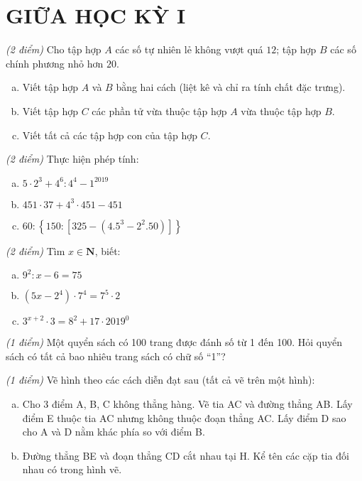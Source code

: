 
\section{GIỮA HỌC KỲ I}
\setcounter{ex}{0}
\begin{ex}  \textit{(2 điểm)} Cho tập hợp $A$ các số tự nhiên lẻ không vượt quá $12$; tập hợp $B$ các số chính phương nhỏ hơn $20$.
\begin{enumerate}[a)]
\item Viết tập hợp $A$ và $B$ bằng hai cách (liệt kê và chỉ ra tính chất đặc trưng).
\item Viết tập hợp $C$ các phần tử vừa thuộc tập hợp $A$ vừa thuộc tập hợp $B$. 
\item Viết tất cả các tập hợp con của tập hợp $C$.

\end{enumerate}
\end{ex}     \begin{ex} \textit{(2 điểm)} Thực hiện phép tính:
\begin{enumerate} [a)]
\item $5 \cdot 2^3+4^6:4^4-1^{2019}$
\item $451 \cdot 37 + {4^3} \cdot 451 - 451$
\item $60:\left\{ {150:\left[ {325 - \left( {{{4.5}^3} - {2^2}.50} \right)} \right]} \right\} $ 

\end{enumerate}
\end{ex}     \begin{ex}\textit{(2 điểm)} Tìm $x \in \mathbf{N}$, biết:
 \begin{enumerate}[a)]
\item ${9^2}:x - 6 = 75$
\item $\left( {5x - {2^4}} \right) \cdot{ 7^4} = {7^5} \cdot 2$
\item ${3^{x + 2}} \cdot 3 = {8^2} + {17 \cdot 2019^0}$

\end{enumerate}
\end{ex}     \begin{ex}\textit{(1 điểm)} Một quyển sách có 100 trang được đánh số từ 1 đến 100. Hỏi quyển sách có tất cả bao nhiêu trang sách có chữ số “1”?\\
\end{ex}     \begin{ex} \textit{(1 điểm)} Vẽ hình theo các cách diễn đạt sau (tất cả vẽ trên một hình): 
 \begin{enumerate}[a)]
\item Cho  3 điểm A, B, C không thẳng hàng. Vẽ tia AC và đường thẳng AB. Lấy điểm E thuộc tia AC nhưng không thuộc đoạn thẳng AC. Lấy điểm D sao cho A và D nằm khác phía so với điểm B. 
\item Đường thẳng BE và đoạn thẳng CD cắt nhau tại H. Kể tên các cặp tia đối nhau có trong hình vẽ.


\end{enumerate}
\end{ex}
